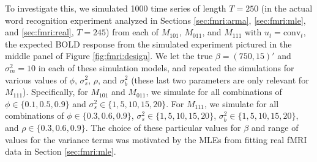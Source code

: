 To investigate this, we simulated 1000 time series of length $T = 250$ (in the actual word recognition experiment analyzed in Sections \ref{sec:fmri:arma}, \ref{sec:fmri:mle}, and \ref{sec:fmri:real}, $T = 245$) from each of $M_{101}$, $M_{011}$, and $M_{111}$ with $u_t = \mbox{conv}_t$, the expected BOLD response from the simulated experiment pictured in the middle panel of Figure \ref{fig:fmri:design}. We let the true $\beta = (750, 15)'$ and $\sigma^2_m = 10$ in each of these simulation models, and repeated the simulations for various values of $\phi$, $\sigma^2_s$, $\rho$, and $\sigma^2_b$ (these last two parameters are only relevant for $M_{111}$). Specifically, for $M_{101}$ and $M_{011}$, we simulate for all combinations of $\phi \in \{0.1, 0.5, 0.9\}$ and $\sigma^2_s \in \{1, 5, 10, 15, 20\}$. For $M_{111}$, we simulate for all combinations of $\phi \in \{0.3, 0.6, 0.9\}$, $\sigma^2_s \in \{1, 5, 10, 15, 20\}$, $\sigma^2_b \in \{1, 5, 10, 15, 20\}$, and $\rho \in \{0.3, 0.6, 0.9\}$. The choice of these particular values for $\beta$ and range of values for the variance terms was motivated by the MLEs from fitting real fMRI data in Section \ref{sec:fmri:mle}.

